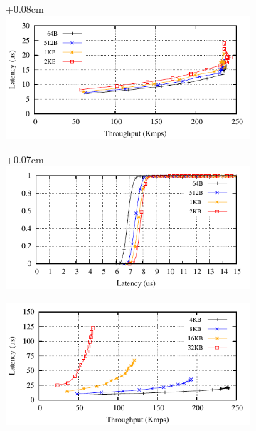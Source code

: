 
\begin{figure}[ht]
  \begin{subfigure}{\columnwidth}
    \advance\leftskip+0.08cm
    \includegraphics[width=0.97\columnwidth]{figures/benchmark/graphs/figure-performance-vs-size-single-group-up-to-4k}
  \end{subfigure}
  \begin{subfigure}{\columnwidth}
    \advance\leftskip+0.07cm
    \includegraphics[width=0.96\columnwidth]{figures/benchmark/graphs/figure-performance-vs-size-single-group-cdf-up-to-4k}
  \end{subfigure}
  \begin{subfigure}{\columnwidth}
    \advance\leftskip-0.1cm
    \includegraphics[width=0.99\columnwidth]{figures/benchmark/graphs/figure-performance-vs-size-single-group-from-4k}

\end{subfigure}
\end{figure}

